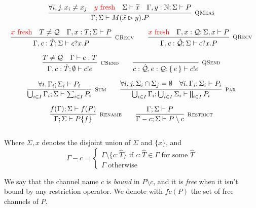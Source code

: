 \begin{gather*}
\infer[\mbox{\footnotesize\scshape QMeas}]{\Gamma; \Sigma \vdash M(\widetilde{x} \rhd y) . P}
{\forall i, j \ldotp x_i \neq x_j & \note{\text{$y$ fresh}} & \Sigma \vdash \widetilde{x} & \Gamma, y : \mathbb{N}; \Sigma \vdash P} \\[0.2cm]
\infer[\mbox{\footnotesize\scshape CRecv}]
{\Gamma, c : \hat{T}; \Sigma \vdash c?x . P}
{\note{\text{$x$ fresh}} & T \neq \mathcal{Q} & \Gamma, x : T; \Sigma \vdash P} 
\qquad
\infer[\mbox{\footnotesize\scshape QRecv}]
{\Gamma, c : \hat{\mathcal{Q}}; \Sigma \vdash c?x . P}
{\note{\text{$x$ fresh}} & \Gamma, x : \mathcal{Q}; \Sigma, x \vdash P} 
\\[0.2cm]
\infer[\mbox{\footnotesize\scshape CSend}]{\Gamma, c : \hat{T}; \emptyset \vdash c!e}{T \neq \mathcal{Q} & \Gamma \vdash e : T} \qquad
\infer[\mbox{\footnotesize\scshape QSend}]{c : \hat{\mathcal{Q}}, e:\mathcal{Q} ; \set{e} \vdash c!e}{} \\[0.2cm]
\infer[\mbox{\footnotesize\scshape Sum}]{\bigcup_{i \in I}\Gamma_i; \Sigma \vdash \sum_{i \in I} P_i}{\forall i \ldotp \Gamma_i; \Sigma_i \vdash P_i} \qquad 
\infer[\mbox{\footnotesize\scshape Par}]{\bigcup_{i \in I}\Gamma_i; \bigcup_{i \in I}\Sigma_i \vdash \bigparallel_{i \in I} P_i}
{\forall i, j \ldotp \Sigma_i \cap \Sigma_j = \emptyset & \forall i \ldotp \Gamma_i; \Sigma_i \vdash P_i} \\[0.2cm]
\infer[\mbox{\footnotesize\scshape Rename}]{\Gamma; \Sigma \vdash P \{f\}}{f(\Gamma); \Sigma \vdash f(P)} \qquad
\infer[\mbox{\footnotesize\scshape Restrict}]{\Gamma - c; \Sigma \vdash P \setminus c}{\Gamma; \Sigma \vdash P} \\[0.3cm]
\end{gather*}

Where $\Sigma, x$ denotes the disjoint union of $\Sigma$ and $\{x\}$, and
\[\Gamma - c = \begin{cases}
\Gamma \setminus \{c : \hat{T}\} \text{ if } c: \hat{T} \in \Gamma \text{ for some } \hat{T} \\
\Gamma \text{ otherwise}
\end{cases}\]

We say that the channel name $c$ is \textit{bound} in $P\setminus c$, and it is \textit{free} when it isn't bound by any restriction operator. We denote with $fc(P)$ the set of free channels of $P$.


